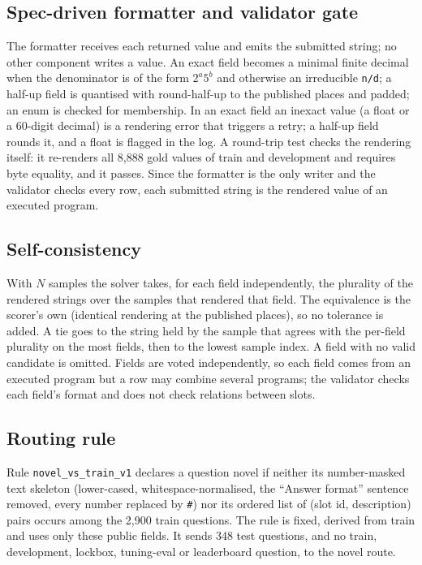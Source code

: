 \documentclass[conference]{IEEEtran}
\newcommand{\id}[1]{\texttt{#1}}
\begin{document}
\subsection{Spec-driven formatter and validator gate}
The formatter receives each returned value and emits the submitted string; no other component writes a value. An exact field becomes a minimal finite decimal when the denominator is of the form $2^a5^b$ and otherwise an irreducible \id{n/d}; a half-up field is quantised with round-half-up to the published places and padded; an enum is checked for membership. In an exact field an inexact value (a float or a 60-digit decimal) is a rendering error that triggers a retry; a half-up field rounds it, and a float is flagged in the log. A round-trip test checks the rendering itself: it re-renders all 8,888 gold values of train and development and requires byte equality, and it passes. Since the formatter is the only writer and the validator checks every row, each submitted string is the rendered value of an executed program.

\subsection{Self-consistency}\label{sec:voting}
With $N$ samples the solver takes, for each field independently, the plurality of the rendered strings over the samples that rendered that field. The equivalence is the scorer's own (identical rendering at the published places), so no tolerance is added. A tie goes to the string held by the sample that agrees with the per-field plurality on the most fields, then to the lowest sample index. A field with no valid candidate is omitted. Fields are voted independently, so each field comes from an executed program but a row may combine several programs; the validator checks each field's format and does not check relations between slots.

\subsection{Routing rule}\label{sec:routing}
Rule \id{novel\_vs\_train\_v1} declares a question novel if neither its number-masked text skeleton (lower-cased, whitespace-normalised, the ``Answer format'' sentence removed, every number replaced by \id{\#}) nor its ordered list of (slot id, description) pairs occurs among the 2,900 train questions. The rule is fixed, derived from train and uses only these public fields. It sends 348 test questions, and no train, development, lockbox, tuning-eval or leaderboard question, to the novel route.
\end{document}
